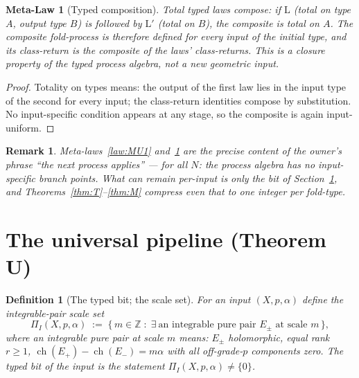 \documentclass[11pt]{article}
\newtheorem{remark}[theorem]{Remark}
\newtheorem{definition}[theorem]{Definition}
\newtheorem{meta-law}[theorem]{Meta-Law}
\newcommand{\ch}{\operatorname{ch}}
\newcommand{\Z}{\mathbb{Z}}
\begin{document}
\begin{meta-law}[Typed composition]
\label{law:MU2}
Total typed laws compose: if $\mathrm L$ (total on type $A$, output type
$B$) is followed by $\mathrm L'$ (total on $B$), the composite is total on
$A$.  The composite fold-process is therefore defined for every input of the
initial type, and its class-return is the composite of the laws'
class-returns.  This is a closure property of the typed process algebra, not
a new geometric input.
\end{meta-law}

\begin{proof}
Totality on types means: the output of the first law lies in the input type
of the second for every input; the class-return identities compose by
substitution.  No input-specific condition appears at any stage, so the
composite is again input-uniform.
\end{proof}

\begin{remark}
Meta-laws~\ref{law:MU1} and~\ref{law:MU2} are the precise content of the
owner's phrase ``the next process applies'' --- for all $N$: the process
algebra has no input-specific branch points.  What can remain per-input is
only the \emph{bit} of Section~\ref{sec:pipeline}, and
Theorems~\ref{thm:T}--\ref{thm:M} compress even that to one integer per
fold-type.
\end{remark}

\section{The universal pipeline (Theorem U)}
\label{sec:pipeline}

\begin{definition}[The typed bit; the scale set]
\label{def:bit}
For an input $(X,p,\alpha)$ define the \emph{integrable-pair scale set}
\[
\Pi_I(X,p,\alpha)\;:=\;\bigl\{\,m\in\Z\;:\;
\exists\ \text{an integrable pure pair } E_\pm \text{ at scale } m
\,\bigr\},
\]
where an integrable pure pair at scale $m$ means: $E_\pm$ holomorphic, equal
rank $r\ge1$, $\ch(E_+)-\ch(E_-)=m\alpha$ with all off-grade-$p$ components
zero.  The \emph{typed bit} of the input is the statement
$\Pi_I(X,p,\alpha)\ne\{0\}$.
\end{definition}
\end{document}
